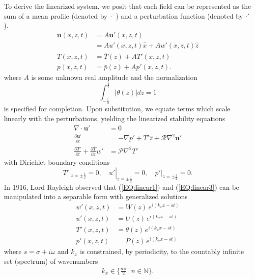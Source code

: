 \documentclass[reprint,amsmath,amssymb,aps]{revtex4-1}
\begin{document}
To derive the linearized system, we posit that each field can be represented as the sum of a mean profile (denoted by $\bar{\cdot } \;$) and a perturbation function (denoted by $\cdot'$).
\begin{align}
    \mathbf{u}(x, z, t) &= A\mathbf{u'}(x, z, t) \label{EQ:reynolds_dc_u}\\
    &= Au'(x, z, t)\hat{x} + Aw'(x, z, t)\hat{z} \\
    T(x, z, t) &= \bar{T}(z) + AT'(x, z, t) \label{EQ:reynolds_dc_T}\\
    p(x, z, t) &= \bar{p}(z) + Ap'(x, z, t).
\end{align}
where $A$ is some unknown real amplitude and the normalization
\begin{equation}
    \int_{-\frac{1}{2}}^{\frac{1}{2}} \big| \theta (z) \big| dz = 1
\end{equation}
is specified for completion.
Upon substitution, we equate terms which scale linearly with the perturbations, yielding the linearized stability equations
\begin{align}
    \nabla \cdot \mathbf{u'} &= 0 \label{EQ:linear1}\\
    \frac{\partial\mathbf{u'}}{\partial t} &= - \nabla p' + T'\hat{z} + \mathcal{R} \nabla^2 \mathbf{u'} \label{EQ:linear2}\\
    \frac{\partial T'}{\partial t} + \frac{\partial \bar{T}}{\partial z} w' &= \mathcal{P} \nabla^2 T' \label{EQ:linear3}
\end{align}
with Dirichlet boundary conditions 
\begin{equation}
    T'|_{z = \pm \frac{1}{2}} = 0, \quad u'|_{z = \pm \frac{1}{2}} = 0, \quad p'|_{z = \pm \frac{1}{2}} = 0.
\end{equation}
In 1916, Lord Rayleigh observed that (\ref{EQ:linear1}) and (\ref{EQ:linear3}) can be manipulated into a separable form with generalized solutions
\begin{align}
    w'(x, z, t) &= W(z) \, e^{i(k_xx-st)} \label{EQ:normal_modes1}\\ 
    u'(x, z, t) &= U(z) \, e^{i(k_xx-st)} \label{EQ:normal_modes2}\\ 
    T'(x, z, t) &= \theta(z) \, e^{i(k_xx-st)} \label{EQ:normal_modes3}\\ 
    p'(x, z, t) &= P(z) \, e^{i(k_xx-st)}\label{EQ:normal_modes4}
\end{align}
where $s = \sigma + i\omega$ and $k_x$ is constrained, by periodicity, to the countably infinite set (spectrum) of wavenumbers
\begin{align}
    k_x \in \big\{\frac{n\pi}{2} \, \big| \, n \in \mathbb{N}\big\}.
\end{align}
\end{document}
